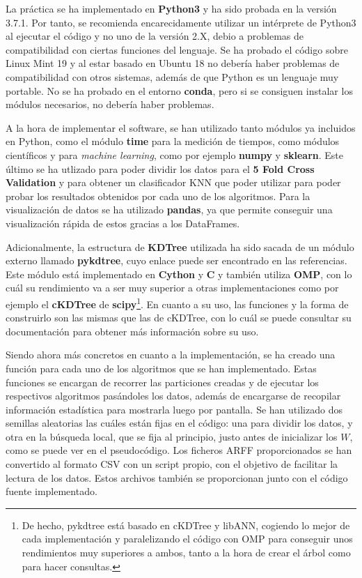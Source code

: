 \documentclass[11pt,a4paper]{article}
\begin{document}
La práctica se ha implementado en \textbf{Python3} y ha sido probada en la versión 3.7.1. Por tanto, se recomienda
encarecidamente utilizar un intérprete de Python3 al ejecutar el código y no uno de la versión 2.X, debio a problemas
de compatibilidad con ciertas funciones del lenguaje. Se ha probado el código sobre Linux Mint 19 y al estar basado en
Ubuntu 18 no debería haber problemas de compatibilidad con otros sistemas, además de que Python es un lenguaje muy portable.
No se ha probado en el entorno \textbf{conda}, pero si se consiguen instalar los módulos necesarios, no debería haber
problemas.

A la hora de implementar el software, se han utilizado tanto módulos ya incluidos en Python, como el módulo \textbf{time}
para la medición de tiempos, como módulos científicos y para \textit{machine learning}, como por ejemplo \textbf{numpy} y
\textbf{sklearn}. Este último se ha utlizado para poder dividir los datos para el \textbf{5 Fold Cross Validation}
y para obtener un clasificador KNN que poder utilizar para poder probar los resultados obtenidos por cada uno de los
algoritmos. Para la visualización de datos se ha utilizado \textbf{pandas}, ya que permite conseguir una visualización rápida
de estos gracias a los DataFrames.

Adicionalmente, la estructura de \textbf{KDTree} utilizada ha sido sacada de un módulo externo llamado
\textbf{pykdtree}, cuyo enlace puede ser encontrado en las referencias. Este módulo está implementado en \textbf{Cython} y
\textbf{C} y también utiliza \textbf{OMP}, con lo cuál su rendimiento va a ser muy superior a otras implementaciones como
por ejemplo el \textbf{cKDTree} de \textbf{scipy}\footnote{De hecho, pykdtree está basado en cKDTree y libANN, cogiendo lo
mejor de cada implementación y paralelizando el código con OMP para conseguir unos rendimientos muy superiores a ambos,
tanto a la hora de crear el árbol como para hacer consultas.}. En cuanto a su uso, las funciones y la forma de construirlo
son las mismas que las de cKDTree, con lo cuál se puede consultar su documentación para obtener más información sobre
su uso.

Siendo ahora más concretos en cuanto a la implementación, se ha creado una función para cada uno de los algoritmos que se
han implementado. Estas funciones se encargan de recorrer las particiones creadas y de ejecutar los respectivos
algoritmos pasándoles los datos, además de encargarse de recopilar información estadística para mostrarla luego por
pantalla. Se han utilizado dos semillas aleatorias las cuáles están fijas en el código: una para dividir los datos, y otra en
la búsqueda local, que se fija al principio, justo antes de inicializar los $W$, como se puede ver en el pseudocódigo. Los
ficheros ARFF proporcionados se han convertido al formato CSV con un script propio, con el objetivo de facilitar la lectura
de los datos. Estos archivos también se proporcionan junto con el código fuente implementado.
\end{document}
